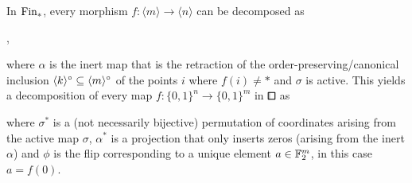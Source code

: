 \begin{remark}\label{rem:bbox-factorization}
In $\mathrm{Fin}_\ast$, every morphism $f\colon\langle m\rangle\to\langle n\rangle$
can be decomposed as
\begin{center}
,
\end{center}
where $\alpha$ is the inert map that is the retraction of the order-preserving/canonical    
inclusion $\langle k\rangle^\circ\subseteq\langle m\rangle^\circ$ of the points $i$ where $f(i)\neq\ast$
and $\sigma$ is active.
This yields a decomposition of every map $f\colon\{0,1\}^n\to\{0,1\}^m$ in $\bbox$ as
\begin{center}
\end{center}
where $\sigma^\ast$ is a (not necessarily bijective) permutation of coordinates arising from the active map $\sigma$,
$\alpha^\ast$ is a projection that only inserts zeros (arising from the inert $\alpha$)
and $\phi$ is the flip corresponding to a unique element $a\in\mathbb{F}_2^m$, in this case $a=f(0)$.
\end{remark}


